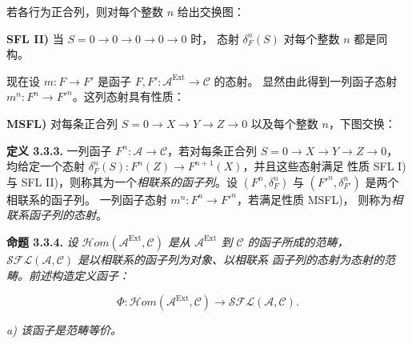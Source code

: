 \clearpage
{}%
\begingroup\small\setlength{\parskip}{0pt}\setlength{\emergencystretch}{1.5em}
\setlength{\abovedisplayskip}{4pt plus 2pt minus 2pt}%
\setlength{\belowdisplayskip}{4pt plus 2pt minus 2pt}%

若各行为正合列，则对每个整数 $n$ 给出交换图：
\begin{center}
\end{center}

\noindent\textbf{SFL II)} 当
$S=0\longrightarrow0\longrightarrow0\longrightarrow0\longrightarrow0$ 时，
态射 $\delta_F^n(S)$ 对每个整数 $n$ 都是同构。

现在设 $m\colon F\longrightarrow F'$ 是函子
$F,F'\colon\mathcal A^{\operatorname{Ext}}\longrightarrow\mathcal C$ 的态射。
显然由此得到一列函子态射
$m^n\colon F^n\longrightarrow {F'}^n$。这列态射具有性质：

\noindent\textbf{MSFL)} 对每条正合列
$S=0\longrightarrow X\longrightarrow Y\longrightarrow Z\longrightarrow0$
以及每个整数 $n$，下图交换：

\begin{center}
\end{center}

\medskip\noindent\textbf{定义 3.3.3.}\quad
一列函子 $F^n\colon\mathcal A\longrightarrow\mathcal C$，若对每条正合列
$S=0\longrightarrow X\longrightarrow Y\longrightarrow Z\longrightarrow0$，
均给定一个态射
$\delta_F^n(S)\colon F^n(Z)\longrightarrow F^{n+1}(X)$，并且这些态射满足
性质 SFL I) 与 SFL II)，则称其为一个\emph{相联系的函子列}。设
$(F^n,\delta_F^n)$ 与 $({F'}^n,\delta_{F'}^n)$ 是两个相联系的函子列。
一列函子态射 $m^n\colon F^n\longrightarrow {F'}^n$，若满足性质 MSFL)，
则称为\emph{相联系函子列的态射}。

\medskip\noindent\textbf{命题 3.3.4.}\quad
\textit{设
$\mathcal H\!om(\mathcal A^{\operatorname{Ext}},\mathcal C)$ 是从
$\mathcal A^{\operatorname{Ext}}$ 到 $\mathcal C$ 的函子所成的范畴，
$\mathcal{SFL}(\mathcal A,\mathcal C)$ 是以相联系的函子列为对象、以相联系
函子列的态射为态射的范畴。前述构造定义函子：}

\[
\Phi\colon
\mathcal H\!om(\mathcal A^{\operatorname{Ext}},\mathcal C)
\longrightarrow\mathcal{SFL}(\mathcal A,\mathcal C).
\]

\noindent\textit{a) 该函子是范畴等价。}
\endgroup
